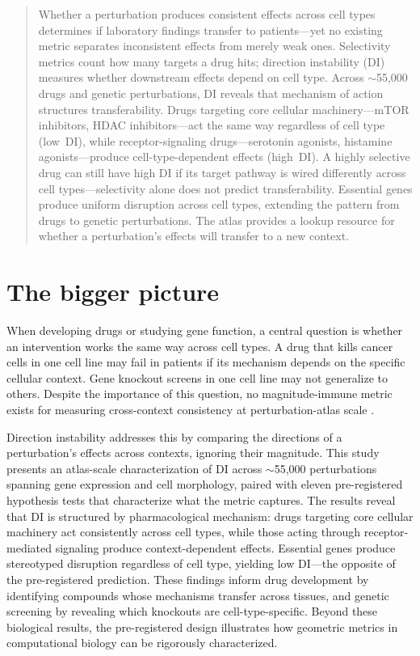 \documentclass[11pt]{article}
\begin{document}
\begin{quote}
Whether a perturbation produces consistent effects across cell
types determines if laboratory findings transfer to patients---yet no
existing metric separates inconsistent effects from merely weak ones.
Selectivity metrics count how many targets a drug hits; direction
instability (DI) measures whether downstream effects depend on cell
type.  Across ${\sim}$55{,}000 drugs and genetic perturbations, DI
reveals that mechanism of action structures transferability.  Drugs
targeting core cellular machinery---mTOR inhibitors, HDAC
inhibitors---act the same way regardless of cell type (low~DI), while
receptor-signaling drugs---serotonin agonists, histamine
agonists---produce cell-type-dependent effects (high~DI).  A highly
selective drug can still have high DI if its target pathway is wired
differently across cell types---selectivity alone does not predict
transferability.  Essential genes produce uniform disruption across cell types,
extending the pattern from drugs to genetic perturbations.  The atlas provides
a lookup resource for whether a perturbation's effects will transfer to
a new context.
\end{quote}

\section*{The bigger picture}
When developing drugs or studying gene function, a central question is
whether an intervention works the same way across cell types.  A drug
that kills cancer cells in one cell line may fail in patients if its
mechanism depends on the specific cellular context.  Gene knockout
screens in one cell line may not generalize to others.  Despite the
importance of this question, no magnitude-immune metric exists for
measuring cross-context consistency at perturbation-atlas scale
\citep{tower2026confound}.

Direction instability addresses this by comparing the directions of a
perturbation's effects across contexts, ignoring their magnitude.  This
study presents an atlas-scale characterization of DI across
${\sim}$55{,}000 perturbations spanning gene expression and cell
morphology, paired with eleven pre-registered hypothesis tests that
characterize what the metric captures.  The results reveal that DI is
structured by pharmacological mechanism: drugs targeting core cellular
machinery act consistently across cell types, while those acting through
receptor-mediated signaling produce context-dependent effects.  Essential
genes produce stereotyped disruption regardless of cell type, yielding
low DI---the opposite of the pre-registered prediction.  These findings inform drug development by identifying compounds whose
mechanisms transfer across tissues, and genetic screening by revealing
which knockouts are cell-type-specific.
Beyond these biological results, the pre-registered design illustrates
how geometric metrics in computational biology can be rigorously
characterized.
\end{document}
